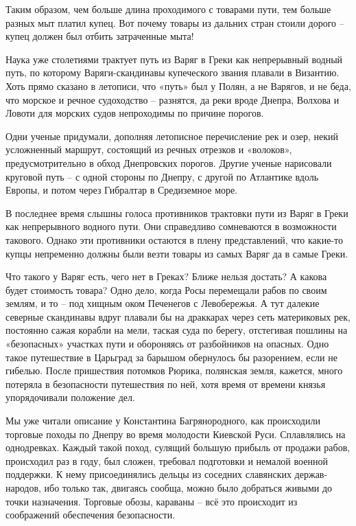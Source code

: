 Таким образом, чем больше длина проходимого с товарами пути, тем больше разных мыт платил купец. Вот почему товары из дальних стран стоили дорого – купец должен был отбить затраченные мыта!

Наука уже столетиями трактует путь из Варяг в Греки как непрерывный водный путь, по которому Варяги-скандинавы купеческого звания плавали в Византию. Хоть прямо сказано в летописи, что «путь» был у Полян, а не Варягов, и не беда, что морское и речное судоходство – разнятся, да реки вроде Днепра, Волхова и Ловоти для морских судов непроходимы по причине порогов. 

Одни ученые придумали, дополняя летописное перечисление рек и озер, некий усложненный маршрут, состоящий из речных отрезков и «волоков», предусмотрительно в обход Днепровских порогов. Другие ученые нарисовали круговой путь – с одной стороны по Днепру, с другой по Атлантике вдоль Европы, и потом через Гибралтар в Средиземное море.

В последнее время слышны голоса противников трактовки пути из Варяг в Греки как непрерывного водного пути. Они справедливо сомневаются в возможности такового. Однако эти противники остаются в плену представлений, что какие-то купцы непременно должны были везти товары из самых Варяг да в самые Греки.

Что такого у Варяг есть, чего нет в Греках? Ближе нельзя достать? А какова будет стоимость товара? Одно дело, когда Росы перемещали рабов по своим землям, и то – под хищным оком Печенегов с Левобережья. А тут далекие северные скандинавы вдруг плавали бы на драккарах через сеть материковых рек, постоянно сажая корабли на мели, таская суда по берегу, отстегивая пошлины на «безопасных» участках пути и обороняясь от разбойников на опасных. Одно такое путешествие в Царьград за барышом обернулось бы разорением, если не гибелью. После пришествия потомков Рюрика, полянская земля, кажется, много потеряла в безопасности путешествия по ней, хотя время от времени князья упорядочивали положение дел.
 
Мы уже читали описание у Константина Багрянородного, как происходили торговые походы по Днепру во время молодости Киевской Руси. Сплавлялись на однодревках. Каждый такой поход, сулящий большую прибыль от продажи рабов, происходил раз в году, был сложен, требовал подготовки и немалой военной поддержки. К нему присоединялись дельцы из соседних славянских держав-народов, ибо только так, двигаясь сообща, можно было добраться живыми до точки назначения. Торговые обозы, караваны – всё это происходит из соображений обеспечения безопасности.

